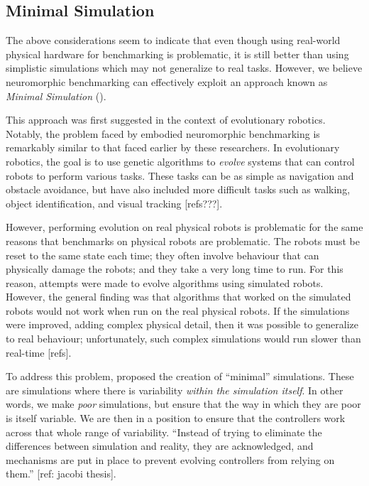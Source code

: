 \documentclass{frontiersSCNS} %
\begin{document}
\subsection{Minimal Simulation}

The above considerations seem to indicate that even though using real-world
physical hardware for benchmarking is problematic, it is still better than
using simplistic simulations which may not generalize to real tasks.  However,
we believe neuromorphic benchmarking can effectively exploit an approach 
known as \emph{Minimal Simulation}
(\citealt{Jakobi97evolutionaryrobotics}).

This approach was first suggested in the context of evolutionary robotics.  
Notably, the problem faced by embodied neuromorphic benchmarking is remarkably 
similar to that faced earlier by these researchers. 
In evolutionary robotics, the
goal is to use genetic algorithms to \emph{evolve} systems that can control
robots to perform various tasks.  These tasks can be as simple as navigation
and obstacle avoidance, but have also included more difficult tasks such as walking,
object identification, and visual tracking [refs???].

However, performing evolution on real physical robots is problematic
for the same reasons that benchmarks on physical robots are problematic.  The
robots must be reset to the same state each time; they often involve
behaviour that can physically damage the robots; and they take a very long
time to run.  For this reason, attempts were made to evolve algorithms using simulated
robots.  However, the general finding was that algorithms that worked on the
simulated robots would not work when run on the real physical robots.  If
the simulations were improved, adding complex physical detail, then it was
possible to generalize to real behaviour; unfortunately, such complex
simulations would run slower than real-time [refs].

To address this problem, \cite{Jakobi97evolutionaryrobotics} proposed the creation of
``minimal'' simulations.  These are simulations where there is variability
\emph{within the simulation itself}.  In other words, we make \emph{poor}
simulations, but ensure that the way in which they are poor is itself
variable.  We are then in a position to ensure that the controllers work across that whole
range of variability.  ``Instead of trying to eliminate the differences between
simulation and reality, they are acknowledged, and mechanisms are put in place
to prevent evolving controllers from relying on them.'' [ref: jacobi thesis].
\end{document}
